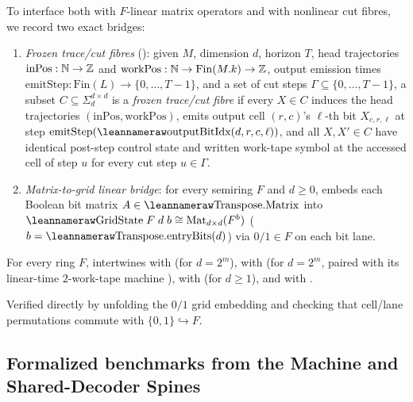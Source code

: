 To interface  both with $F$-linear matrix operators and with nonlinear cut
fibres, we record two exact bridges:
\begin{enumerate}[label=(\alph*)]
\item \emph{Frozen trace/cut fibres} (): given $M$, dimension $d$,
  horizon $T$, head trajectories $\mathrm{inPos} : \mathbb{N} \to \mathbb{Z}$ and
  $\mathrm{workPos} : \mathbb{N} \to \mathrm{Fin}(M.k) \to \mathbb{Z}$, output emission times
  $\mathrm{emitStep} : \mathrm{Fin}(L) \to \{0,\dots,T-1\}$, and a set of cut steps
  $\Gamma \subseteq \{0,\dots,T-1\}$, a subset $C \subseteq \Sigma_d^{d\times d}$ is a
  \emph{frozen trace/cut fibre} if every $X \in C$ induces the head trajectories
  $(\mathrm{inPos}, \mathrm{workPos})$, emits output cell $(r,c)$'s $\ell$-th bit $X_{c,r,\ell}$ at
  step $\mathrm{emitStep}(\lean{outputBitIdx}(d,r,c,\ell))$, and all $X, X' \in C$ have identical
  post-step control state and written work-tape symbol at the accessed cell of step $u$ for every
  cut step $u \in \Gamma$.
\item \emph{Matrix-to-grid linear bridge}: for every semiring $F$ and $d \ge 0$,
   embeds each Boolean bit matrix
  $A \in \leanname{Transpose.Matrix}$ into $\lean{GridState}\;F\;d\;b \cong \Mat_{d\times d}(F^b)$
  ($b = \leanname{Transpose.entryBits}(d)$) via $0/1 \in F$ on each bit lane.
\end{enumerate}

\begin{proposition}\label{prop:tm-grid-bridge}
For every ring $F$,  intertwines
 with  (for $d = 2^m$),
 with  (for $d = 2^m$, paired with its
linear-time $2$-work-tape machine ),
 with  (for $d \ge 1$), and
 with .
\end{proposition}
\begin{outline}
Verified directly by unfolding the $0/1$ grid embedding  and checking
that cell/lane permutations commute with $\{0,1\} \hookrightarrow F$.
\end{outline}

\subsection{Formalized benchmarks from the Machine and Shared-Decoder Spines}\label{sec:benchmarks}

